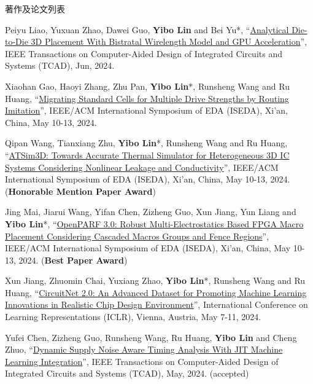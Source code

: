 \begin{rSection}{著作及论文列表}
\begin{description}[font=\normalfont, rightmargin=2em]
{}
            

\item[{[J147]}]{
        Peiyu Liao, Yuxuan Zhao, Dawei Guo, \textbf{Yibo Lin} and Bei Yu*, 
    ``\href{https://doi.org/10.1109/TCAD.2023.3347293}{Analytical Die-to-Die 3D Placement With Bistratal Wirelength Model and GPU Acceleration}'', 
    IEEE Transactions on Computer-Aided Design of Integrated Circuits and Systems (TCAD), Jun, 2024.
    
}
            

\item[{[C146]}]{
        Xiaohan Gao, Haoyi Zhang, Zhu Pan, \textbf{Yibo Lin}*, Runsheng Wang and Ru Huang, 
    ``\href{https://doi.org/10.1109/ISEDA62518.2024.10617650}{Migrating Standard Cells for Multiple Drive Strengths by Routing Imitation}'', 
    IEEE/ACM International Symposium of EDA (ISEDA), Xi'an, China, May 10-13, 2024.
    
}
            

\item[{[C145]}]{
        Qipan Wang, Tianxiang Zhu, \textbf{Yibo Lin}*, Runsheng Wang and Ru Huang, 
    ``\href{https://doi.org/10.1109/ISEDA62518.2024.10617604}{ATSim3D: Towards Accurate Thermal Simulator for Heterogeneous 3D IC Systems Considering Nonlinear Leakage and Conductivity}'', 
    IEEE/ACM International Symposium of EDA (ISEDA), Xi'an, China, May 10-13, 2024.
    (\textbf{Honorable Mention Paper Award})
}
            

\item[{[C144]}]{
        Jing Mai, Jiarui Wang, Yifan Chen, Zizheng Guo, Xun Jiang, Yun Liang and \textbf{Yibo Lin}*, 
    ``\href{https://doi.org/10.1109/ISEDA62518.2024.10617535}{OpenPARF 3.0: Robust Multi-Electrostatics Based FPGA Macro Placement Considering Cascaded Macros Groups and Fence Regions}'', 
    IEEE/ACM International Symposium of EDA (ISEDA), Xi'an, China, May 10-13, 2024.
    (\textbf{Best Paper Award})
}
            

\item[{[C143]}]{
        Xun Jiang, Zhuomin Chai, Yuxiang Zhao, \textbf{Yibo Lin}*, Runsheng Wang and Ru Huang, 
    ``\href{https://openreview.net/pdf?id=nMFSUjxMIl}{CircuitNet 2.0: An Advanced Dataset for Promoting Machine Learning Innovations in Realistic Chip Design Environment}'', 
    International Conference on Learning Representations (ICLR), Vienna, Austria, May 7-11, 2024.
    
}
            

\item[{[J142]}]{
        Yufei Chen, Zizheng Guo, Runsheng Wang, Ru Huang, \textbf{Yibo Lin} and Cheng Zhuo, 
    ``\href{https://doi.org/10.1109/TCAD.2023.3342603}{Dynamic Supply Noise Aware Timing Analysis With JIT Machine Learning Integration}'', 
    IEEE Transactions on Computer-Aided Design of Integrated Circuits and Systems (TCAD), May, 2024.
    (accepted)
}
            


\end{description}
\end{rSection}
